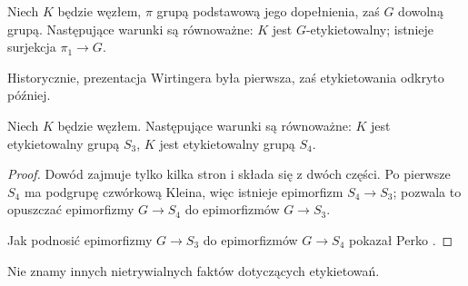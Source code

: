 \begin{proposition}
    Niech $K$ będzie węzłem, $\pi$ grupą podstawową jego dopełnienia, zaś $G$ dowolną grupą.
    Następujące warunki są równoważne: $K$ jest $G$-etykietowalny; istnieje surjekcja $\pi_1 \to G$.
\end{proposition}

Historycznie, prezentacja Wirtingera była pierwsza, zaś etykietowania odkryto później.

\begin{proposition}[Perko]
    Niech $K$ będzie węzłem.
    Następujące warunki są równoważne: $K$ jest etykietowalny grupą $S_3$, $K$ jest etykietowalny grupą $S_4$.
\end{proposition}

\begin{proof}
    Dowód zajmuje tylko kilka stron i składa się z dwóch części.
    Po pierwsze $S_4$ ma podgrupę czwórkową Kleina, więc istnieje epimorfizm $S_4 \to S_3$; pozwala to opuszczać epimorfizmy $G \to S_4$ do epimorfizmów $G \to S_3$.
    
    Jak podnosić epimorfizmy $G \to S_3$ do epimorfizmów $G \to S_4$ pokazał Perko \cite{perko1975}.
\end{proof}

Nie znamy innych nietrywialnych faktów dotyczących etykietowań.

%

